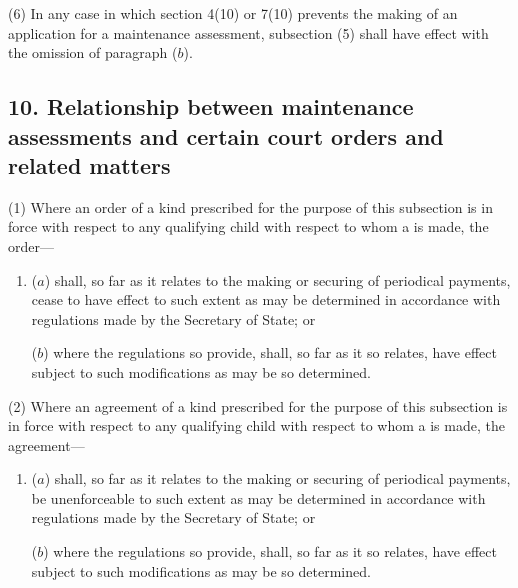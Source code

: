\documentclass[12pt,a4paper]{article}
\begin{document}
(6) In any case in which section 4(10) or 7(10) prevents the making of an
application for a maintenance assessment, subsection (5) shall have effect with
the omission of paragraph ($b$).


\subsection{10. Relationship between
maintenance assessments
and certain court orders
and related matters}

(1) Where an order of a kind prescribed for the purpose of this subsection is in
force with respect to any qualifying child with respect to whom a 
is made, the order---
\begin{enumerate}\item[]
($a$)
shall, so far as it relates to the making or securing of periodical payments,
cease to have effect to such extent as may be determined in accordance
with regulations made by the Secretary of State; or

($b$)
where the regulations so provide, shall, so far as it so relates, have effect
subject to such modifications as may be so determined.
\end{enumerate}

(2)
Where an agreement of a kind prescribed for the purpose of this subsection
is in force with respect to any qualifying child with respect to whom a 
is made, the agreement---
\begin{enumerate}\item[]
($a$)
shall, so far as it relates to the making or securing of periodical payments,
be unenforceable to such extent as may be determined in accordance with
regulations made by the Secretary of State; or

($b$)
where the regulations so provide, shall, so far as it so relates, have effect
subject to such modifications as may be so determined.
\end{enumerate}
\end{document}
